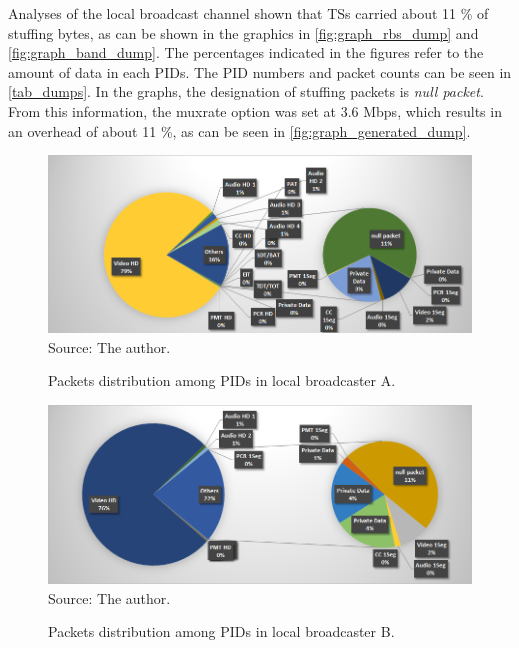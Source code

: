 \documentclass[
	12pt,				%
	openright,			%
	twoside,			%
	a4paper,			%
	brazil,
	french,				%
	english
	]{abntex2}
\begin{document}
Analyses of the local broadcast channel shown that TSs carried about 11 \% of stuffing bytes, as can be shown in the graphics in \autoref{fig:graph_rbs_dump} and \autoref{fig:graph_band_dump}. The percentages indicated in the figures refer to the amount of data in each PIDs. The PID numbers and packet counts can be seen in \autoref{tab_dumps}. In the graphs, the designation of stuffing packets is \textit{null packet}. From this information, the muxrate option was set at 3.6 Mbps, which results in an overhead of about 11 \%, as can be seen in \autoref{fig:graph_generated_dump}.

\begin{figure}[!h]
\centering
\caption{Packets distribution among PIDs in local broadcaster A.}
\includegraphics[width=0.9\linewidth]{figuras/graph_rbs_dump.png}
\\Source: The author.
\label{fig:graph_rbs_dump}
\end{figure}

\begin{figure}[!h]
\centering
\caption{Packets distribution among PIDs in local broadcaster B.}
\includegraphics[width=0.9\linewidth]{figuras/graph_band_dump.png}
\\Source: The author.
\label{fig:graph_band_dump}
\end{figure}
\end{document}

